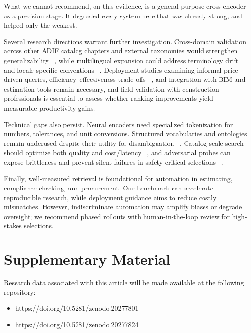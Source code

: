 \documentclass[preprint,12pt]{elsarticle}
\begin{document}
What we cannot recommend, on this evidence, is a general-purpose cross-encoder as a precision stage. It degraded every system here that was already strong, and helped only the weakest.

Several research directions warrant further investigation. Cross-domain validation across other ADIF catalog chapters and external taxonomies would strengthen generalizability ~\cite{royanoAnalysisClassificationSystems2023a}, while multilingual expansion could address terminology drift and locale-specific conventions ~\cite{valentini2024messirve,tang2024we,jungyeon2024cross-lingual}. Deployment studies examining informal price-driven queries, efficiency–effectiveness trade-offs ~\cite{bruch2023analysis}, and integration with BIM and estimation tools remain necessary, and field validation with construction professionals is essential to assess whether ranking improvements yield measurable productivity gains.

Technical gaps also persist. Neural encoders need specialized tokenization for numbers, tolerances, and unit conversions. Structured vocabularies and ontologies remain underused despite their utility for disambiguation ~\cite{yan2022overview,schlachter2021linked}. Catalog-scale search should optimize both quality and cost/latency ~\cite{bruch2023analysis}, and adversarial probes can expose brittleness and prevent silent failures in safety-critical selections ~\cite{wallace2019nlp}.

Finally, well-measured retrieval is foundational for automation in estimating, compliance checking, and procurement. Our benchmark can accelerate reproducible research, while deployment guidance aims to reduce costly mismatches. However, indiscriminate automation may amplify biases or degrade oversight; we recommend phased rollouts with human-in-the-loop review for high-stakes selections.

\appendix
\section{Supplementary Material}
\label{app:supplementary}

Research data associated with this article will be made available at the following repository:

\begin{itemize}
  \item https://doi.org/10.5281/zenodo.20277801
  \item https://doi.org/10.5281/zenodo.20277824
\end{itemize}
\end{document}

